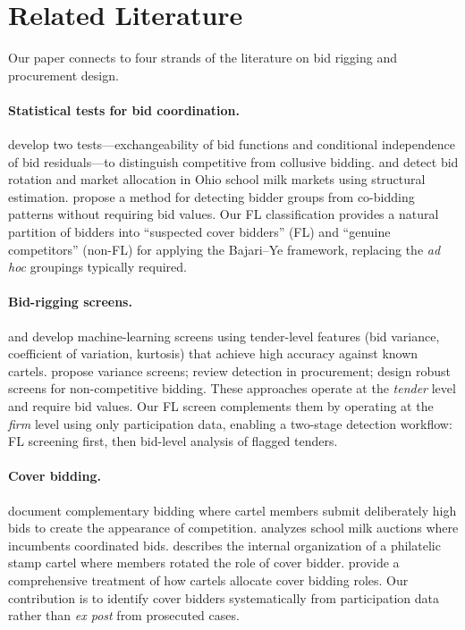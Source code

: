 \section{Related Literature}
\label{sec:literature}

Our paper connects to four strands of the literature on bid rigging and
procurement design.

\paragraph{Statistical tests for bid coordination.}
\citet{bajari2003deciding} develop two tests---exchangeability of bid
functions and conditional independence of bid residuals---to distinguish
competitive from collusive bidding. \citet{porter1993detection} and
\citet{porter1999ohio} detect bid rotation and market allocation in Ohio
school milk markets using structural estimation.
\citet{conley2016detecting} propose a method for detecting bidder groups
from co-bidding patterns without requiring bid values. Our FL
classification provides a natural partition of bidders into ``suspected
cover bidders'' (FL) and ``genuine competitors'' (non-FL) for applying
the Bajari--Ye framework, replacing the \emph{ad hoc} groupings
typically required.

\paragraph{Bid-rigging screens.}
\citet{imhof2019detecting} and \citet{imhof2018screening} develop
machine-learning screens using tender-level features (bid variance,
coefficient of variation, kurtosis) that achieve high accuracy against
known cartels. \citet{abrantesmetz2006a} propose variance screens;
\citet{hüschelrath2014cartel} review detection in procurement;
\citet{chassang2022robust} design robust screens for non-competitive
bidding. These approaches operate at the \emph{tender} level and require
bid values. Our FL screen complements them by operating at the
\emph{firm} level using only participation data, enabling a two-stage
detection workflow: FL screening first, then bid-level analysis of
flagged tenders.

\paragraph{Cover bidding.}
\citet{porter1999ohio} document complementary bidding where cartel
members submit deliberately high bids to create the appearance of
competition. \citet{pesendorfer2000study} analyzes school milk auctions
where incumbents coordinated bids. \citet{asker2010leniency} describes
the internal organization of a philatelic stamp cartel where members
rotated the role of cover bidder. \citet{marshall2012economics} provide a
comprehensive treatment of how cartels allocate cover bidding roles. Our
contribution is to identify cover bidders systematically from
participation data rather than \emph{ex post} from prosecuted cases.

